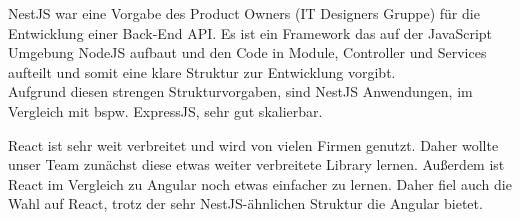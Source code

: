 NestJS war eine Vorgabe des Product Owners (IT Designers Gruppe) für die Entwicklung einer Back-End API. 
Es ist ein Framework das auf der JavaScript Umgebung NodeJS aufbaut und den Code in Module, Controller und Services aufteilt und somit eine klare Struktur zur Entwicklung vorgibt.\\
Aufgrund diesen strengen Strukturvorgaben, sind NestJS Anwendungen, im Vergleich mit bspw. ExpressJS, sehr gut skalierbar.

\begin{table}[!h]
    \centering
    \end{table}

React ist sehr weit verbreitet und wird von vielen Firmen genutzt.
Daher wollte unser Team zunächst diese etwas weiter verbreitete Library lernen. 
Außerdem ist React im Vergleich zu Angular noch etwas einfacher zu lernen.
Daher fiel auch die Wahl auf React, trotz der sehr NestJS-ähnlichen Struktur die Angular bietet.


